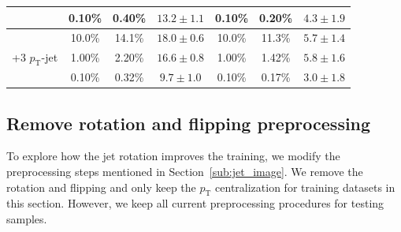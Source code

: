 \documentclass[12pt]{article}
\begin{document}
\begin{table}[htpb]
\begin{tabular}{c|ccc|ccc}
                                                   & 0.10\%                 & 0.40\%                 & $13.2 \pm 1.1$ & 0.10\%                 & 0.20\%                 & $4.3 \pm 1.9$ \\ \hline
            \multirow{3}{*}{+3 $p_{\text{T}}$-jet} & 10.0\%                 & 14.1\%                 & $18.0 \pm 0.6$ & 10.0\%                 & 11.3\%                 & $5.7 \pm 1.4$ \\
                                                   & 1.00\%                 & 2.20\%                 & $16.6 \pm 0.8$ & 1.00\%                 & 1.42\%                 & $5.8 \pm 1.6$ \\
                                                   & 0.10\%                 & 0.32\%                 & $9.7 \pm 1.0$  & 0.10\%                 & 0.17\%                 & $3.0 \pm 1.8$
            \end{tabular}
        \end{table}
    \subsection{Remove rotation and flipping preprocessing}%
    \label{sub:remove_rotation_and_flipping_preprocessing}
        To explore how the jet rotation improves the training, we modify the preprocessing steps mentioned in Section~\ref{sub:jet_image}. We remove the rotation and flipping and only keep the $p_\text{T}$ centralization for training datasets in this section. However, we keep all current preprocessing procedures for testing samples.
\end{document}
